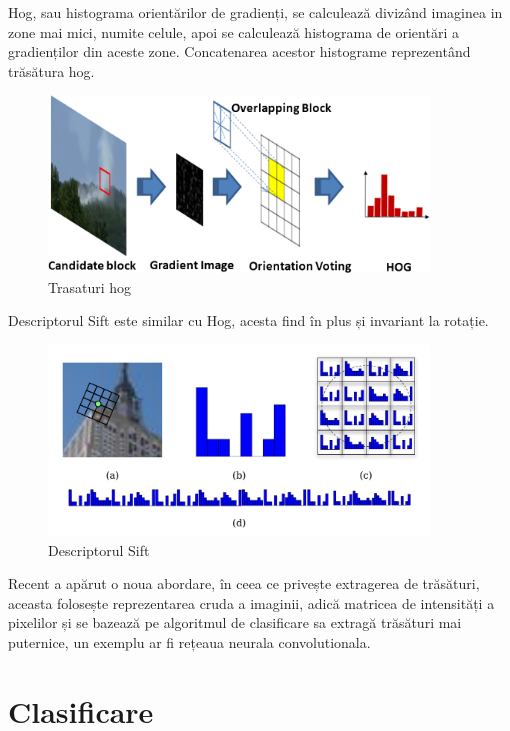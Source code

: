 Hog, sau histograma orientărilor de gradienți, se calculează divizând imaginea in zone mai mici, numite celule, apoi se calculează histograma de orientări a gradienților din aceste zone. 
Concatenarea acestor histograme reprezentând trăsătura hog.
\begin{figure}[H]
	\centering
		\includegraphics[width=0.90\textwidth]{imagini/OE_51_1_017208_f004.png}
	\caption{Trasaturi hog}
	\label{fig:OE_51_1_017208_f004}
\end{figure}

Descriptorul Sift este similar cu Hog, acesta find în plus și invariant la rotație.
\begin{figure}[H]
	\centering
		\includegraphics[width=0.90\textwidth]{imagini/sift.png}
	\caption{Descriptorul Sift}
	\label{fig:sift}
\end{figure}

Recent a apărut o noua abordare, în ceea ce privește extragerea de trăsături, aceasta folosește reprezentarea cruda a imaginii, adică matricea de intensități a pixelilor și se bazează pe algoritmul de clasificare sa extragă trăsături mai puternice, un exemplu ar fi rețeaua neurala convolutionala.\cite{lecun-98}

\pagebreak
\section{Clasificare}

